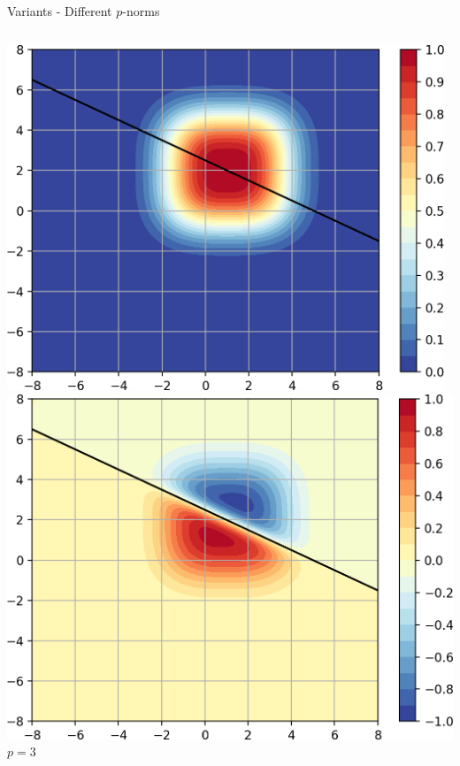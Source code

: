 \documentclass{beamer}
\begin{document}
\begin{frame}{Variants - Different $p$-norms}
\begin{minipage}{0.87\textwidth}
\begin{columns}
\begin{column}{.33\textwidth}
        \includegraphics[width=0.98\textwidth]{images/Variants-Norms/ord3_g-cropped.png}\\
        \includegraphics[width=\textwidth]{images/Variants-Norms/ord3-cropped.png}\\
        \centering $p=3$
    \end{column}
    \end{columns}
    \end{minipage}
\end{frame}
\end{document}
